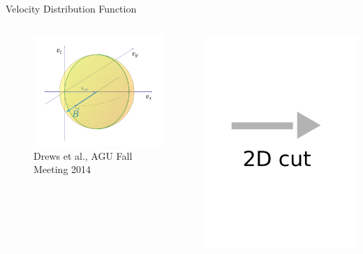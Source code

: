 \documentclass{beamer}
\begin{document}
\begin{frame}{Velocity Distribution Function}
	\begin{minipage}{1\textwidth}
	\begin{columns}
	\column{4.5cm}
		\begin{figure}
			\includegraphics[scale=0.25]{pictures/vdf_3d.png}
			\caption{\tiny{Drews et al., AGU Fall Meeting 2014}}
		\end{figure}
	\column{1.5cm}
		\includegraphics[scale=0.1]{pictures/arrow_2d.pdf}

\end{columns}
\end{minipage}
\end{frame}
\end{document}
